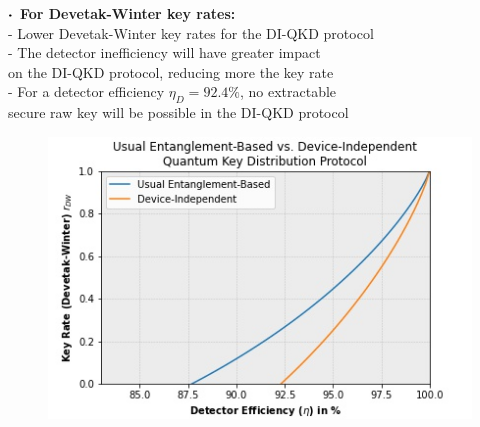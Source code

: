 \documentclass{beamer}
\newcommand\sbullet[1][.5]{\mathbin{\vcenter{\hbox{\scalebox{#1}{$\bullet$}}}}}
\begin{document}
\begin{frame}
\begin{minipage}{0.5\textwidth}
\begin{figure}
                    \vspace{-4ex}
                \caption{\color{blue}{Figure 5: }}
                \end{figure}
            \end{minipage}%
            \begin{minipage}{0.5\textwidth}
                \centering
                \vspace{0.5ex}
                \scriptsize $\sbullet$\, \textbf{For Devetak-Winter key rates:}\\
                \vspace{0.25ex}
                \tiny
                - Lower Devetak-Winter key rates for the DI-QKD protocol\\
                - The detector inefficiency will have greater impact\\ on the DI-QKD protocol, reducing more the key rate\\
                - For a detector efficiency ${\eta}_{D} = 92.4\%$, no extractable\\ secure raw key will be possible in the DI-QKD protocol
                \vspace{-1.2ex}
                \begin{figure}
                    \includegraphics[width=\linewidth]{figures/presentation/jpg/key-rates-bounds-detector-efficiency-plot.jpg}
                    \vspace{-4ex}
                    \caption{\color{blue}{Figure 6: }}
                \end{figure}
            \end{minipage}
            
		\end{frame}
\end{document}
